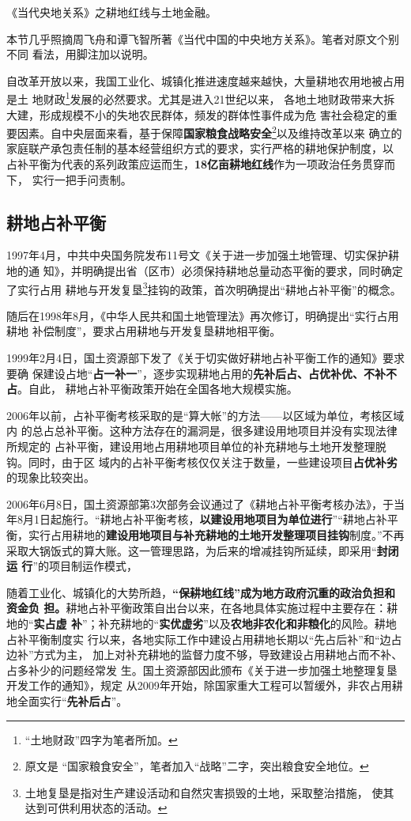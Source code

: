《当代央地关系》之耕地红线与土地金融。

本节几乎照摘周飞舟和谭飞智所著《当代中国的中央地方关系》。笔者对原文个别不同
看法，用脚注加以说明。

自改革开放以来，我国工业化、城镇化推进速度越来越快，大量耕地农用地被占用是土
地财政\footnote{“土地财政”四字为笔者所加。}发展的必然要求。尤其是进入21世纪以来，
各地土地财政带来大拆大建，形成规模不小的失地农民群体，频发的群体性事件成为危
害社会稳定的重要因素。自中央层面来看，基于保障\textbf{国家粮食战略安全}\footnote{原文是
“国家粮食安全”，笔者加入“战略”二字，突出粮食安全地位。}以及维持改革以来
确立的家庭联产承包责任制的基本经营组织方式的要求，实行严格的耕地保护制度，以
占补平衡为代表的系列政策应运而生，\textbf{18亿亩耕地红线}作为一项政治任务贯穿而下，
实行一把手问责制。

\subsection{耕地占补平衡}

1997年4月，中共中央国务院发布11号文《关于进一步加强土地管理、切实保护耕地的通
知》，并明确提出省（区市）必须保持耕地总量动态平衡的要求，同时确定了实行占用
耕地与开发复垦\footnote{土地复垦是指对生产建设活动和自然灾害损毁的土地，采取整治措施，
  使其达到可供利用状态的活动。}挂钩的政策，首次明确提出“耕地占补平衡”的概念。

随后在1998年8月，《中华人民共和国土地管理法》再次修订，明确提出“实行占用耕地
补偿制度”，要求占用耕地与开发复垦耕地相平衡。

1999年2月4日，国土资源部下发了《关于切实做好耕地占补平衡工作的通知》要求要确
保建设占地“\textbf{占一补一}”，逐步实现耕地占用的\textbf{先补后占、占优补优、不补不占}。自此，
耕地占补平衡政策开始在全国各地大规模实施。

2006年以前，占补平衡考核采取的是“算大帐”的方法——以区域为单位，考核区域内
的总占总补平衡。这种方法存在的漏洞是，很多建设用地项目并没有实现法律所规定的
占补平衡，建设用地占用耕地项目单位的补充耕地与土地开发整理脱钩。同时，由于区
域内的占补平衡考核仅仅关注于数量，一些建设项目\textbf{占优补劣}的现象比较突出。

2006年6月8日，国土资源部第3次部务会议通过了《耕地占补平衡考核办法》，于当
年8月1日起施行。“耕地占补平衡考核，\textbf{以建设用地项目为单位进行}”“耕地占补平
衡，实行占用耕地的\textbf{建设用地项目与补充耕地的土地开发整理项目挂钩}制度。”不再
采取大锅饭式的算大账。这一管理思路，为后来的增减挂钩所延续，即采用“\textbf{封闭运
  行}”的项目制运作模式，

随着工业化、城镇化的大势所趋，\textbf{“保耕地红线”成为地方政府沉重的政治负担和资金负
担。}耕地占补平衡政策自出台以来，在各地具体实施过程中主要存在：耕地的“\textbf{实占虚
补}”；补充耕地的“\textbf{实优虚劣}”以及\textbf{农地非农化和非粮化}的风险。耕地占补平衡制度实
行以来，各地实际工作中建设占用耕地长期以“先占后补”和“边占边补”方式为主，
加上对补充耕地的监督力度不够，导致建设占用耕地占而不补、占多补少的问题经常发
生。国土资源部因此颁布《关于进一步加强土地整理复垦开发工作的通知》，规定
从2009年开始，除国家重大工程可以暂缓外，非农占用耕地全面实行“\textbf{先补后占}”。

